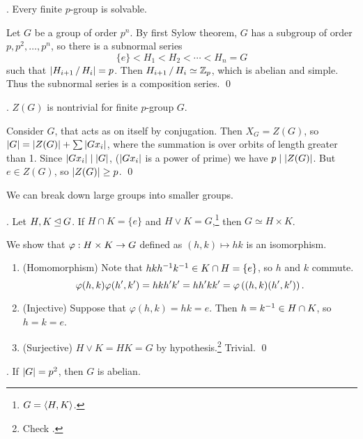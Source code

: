 
\thm. Every finite \(p\)-group is solvable.


\pf Let \(G\) be a group of order \(p^n\). By first Sylow theorem, \(G\) has a subgroup of order \(p, p^2, \dots, p^n\), so there is a subnormal series
\[
    \{e\} < H_1 < H_2 < \cdots < H_n = G
\]
such that \(\left| H_{i+1} \operatorname{/} H_i \right| = p\). Then \(H_{i+1} \operatorname{/} H_i \simeq \mathbb{Z}_p\), which is abelian and simple. Thus the subnormal series is a composition series. \qed

\thm. \(Z(G)\) is nontrivial for finite \(p\)-group \(G\).

\pf Consider \(G\), that acts as on itself by conjugation. Then \(X_G = Z(G)\), so \(\left| G \right| = \left| Z(G) \right| + \sum \left| Gx_i \right|\), where the summation is over orbits of length greater than 1. Since \(\left| Gx_i \right| \mid \left| G \right|\), (\(\left| Gx_i \right|\) is a power of prime) we have \(p \mid \left| Z(G) \right|\). But \(e \in Z(G)\), so \(\left| Z(G) \right| \geq p\). \qed

We can break down large groups into smaller groups.

\lemma. Let \(H, K \unlhd G\). If \(H \cap K = \{e\}\) and \(H \vee K = G\),\footnote{\(G = \left\langle H, K \right\rangle\).} then \(G \simeq H \times K\).

\pf We show that \(\varphi : H \times K \rightarrow G\) defined as \((h, k) \mapsto hk\) is an isomorphism.
\begin{enumerate}
    \item (Homomorphism) Note that \(hkh^{-1} k^{-1} \in K \cap H = \{e\}\), so \(h\) and \(k\) commute.
    \[
        \varphi(h, k) \varphi(h', k') = hkh'k' = hh'kk' = \varphi\left( (h, k)(h', k') \right).
    \]
    \item (Injective) Suppose that \(\varphi(h, k) = hk = e\). Then \(h = k^{-1} \in H\cap K\), so \(h = k = e\).
    \item (Surjective) \(H \vee K = HK = G\) by hypothesis.\footnote{Check .} Trivial. \qed
\end{enumerate}

\thm. If \(\left| G \right| = p^2\), then \(G\) is abelian.

